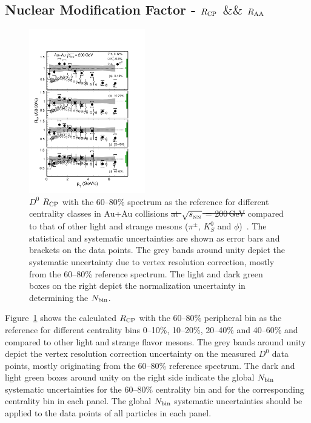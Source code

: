\documentclass[%
 reprint,	
 amsmath,amssymb,
 aps,
 prc,
]{revtex4-1}
\providecommand{\DIFaddtex}[1]{{\protect\color{blue}\uwave{#1}}} %
\providecommand{\DIFdeltex}[1]{{\protect\color{red}\sout{#1}}}                      %
\providecommand{\DIFaddbegin}{} %
\providecommand{\DIFaddend}{} %
\providecommand{\DIFdelbegin}{} %
\providecommand{\DIFdelend}{} %
\providecommand{\DIFdelFL}[1]{\DIFdel{#1}} %
\providecommand{\DIFdelbeginFL}{} %
\providecommand{\DIFdelendFL}{} %
\providecommand{\DIFadd}[1]{\texorpdfstring{\DIFaddtex{#1}}{#1}} %
\providecommand{\DIFdel}[1]{\texorpdfstring{\DIFdeltex{#1}}{}} %
\begin{document}
\subsection{\DIFdelbegin %
\DIFdelend Nuclear Modification Factor - $R_{\rm CP}$ \DIFdelbegin \DIFdel{$\&\&$  }\DIFdelend \DIFaddbegin \DIFadd{and }\DIFaddend $R_{\rm AA}$}
\DIFaddbegin \label{result:RCP}
\DIFaddend 

\begin{figure}
\centering
\includegraphics[width=0.45\textwidth]{fig/D0_Rcp1.pdf}
\caption{$D^{0}$ $R_{\rm CP}$ with the 60--80\% spectrum as the reference for different centrality classes in Au+Au collisions \DIFdelbeginFL \DIFdelFL{at $\sqrt{s_{_{\rm NN}}}$ = 200\,GeV }\DIFdelendFL compared to that of other light and strange mesons ($\pi^{\pm}$, $K^0_{S}$ and $\phi$)~\cite{Adams2006_Identified,Abelev2009,Agakishiev2012}. The statistical and systematic uncertainties are shown as error bars and brackets on the data points. The grey bands around unity depict the systematic uncertainty due to vertex resolution correction, mostly from the 60--80\% reference spectrum. The light and dark green boxes on the right depict the normalization uncertainty in determining the $N_{\rm bin}$.}
\label{fig:D0_Rcp} 
\end{figure}

Figure~\ref{fig:D0_Rcp} shows the calculated $R_{\rm CP}$ with the 60--80\% peripheral bin as the reference for different centrality bins 0--10\%, 10--20\%, 20--40\% and 40--60\% and \DIFaddbegin \DIFadd{is }\DIFaddend compared to other light and strange flavor mesons. The grey bands around unity depict the vertex resolution correction uncertainty on the measured $D^0$ data points, mostly originating from the 60--80\% reference spectrum. The dark and light green boxes around unity on the right side indicate the global $N_{\rm bin}$ systematic uncertainties for the 60--80\% centrality bin and for the corresponding centrality bin in each panel. The global $N_{\rm bin}$ systematic uncertainties should be applied to the data points of all particles in each panel.
\end{document}
